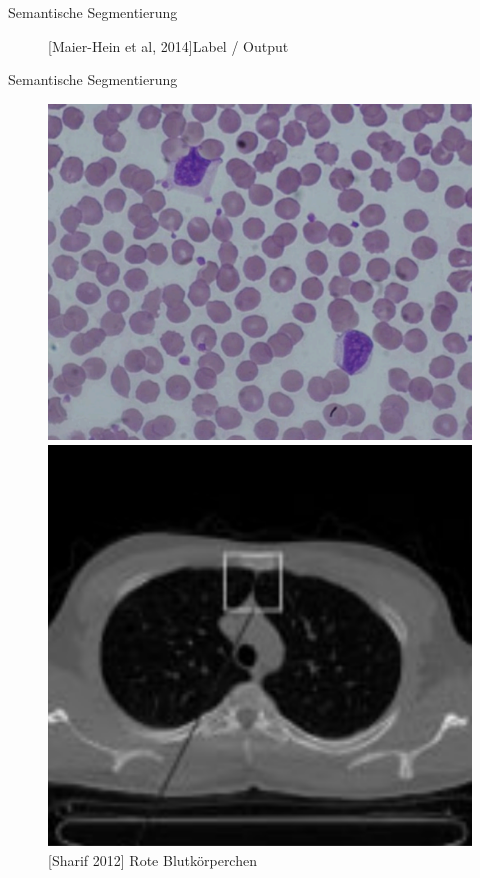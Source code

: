 \begin{frame}{Semantische Segmentierung}
\begin{figure}[ht]
\begin{minipage}[b]{0.45\linewidth}
            \caption{[Maier-Hein et al, 2014]\hspace{\textwidth}Label / Output}
            \label{fig:label}
        \end{minipage}
    \end{figure}
\end{frame}

\begin{frame}{Semantische Segmentierung}
    \begin{figure}[ht]
        \begin{minipage}[b]{0.45\linewidth}
            \centering
            \includegraphics[width=\textwidth]{../images/red-blood.png}
            \caption{[Sharif 2012] Rote Blutkörperchen}
            \label{fig:red-blood}
        \end{minipage}
        \hspace{0.5cm}
        \begin{minipage}[b]{0.45\linewidth}
            \centering
            \includegraphics[width=\textwidth]{../images/lung.png}

\end{minipage}
\end{figure}
\end{frame}
